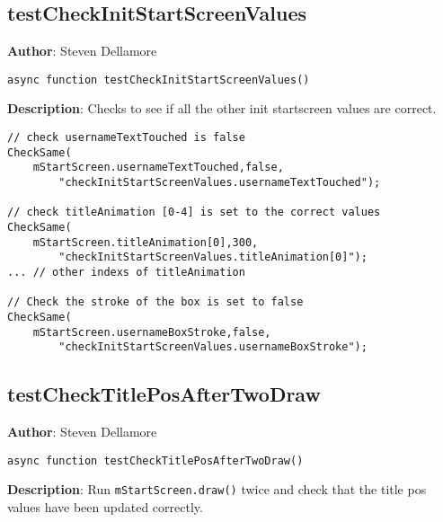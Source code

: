 \documentclass[12pt]{article}
\begin{document}
\subsection{testCheckInitStartScreenValues}
\textbf{Author}: Steven Dellamore 
\vspace*{1\baselineskip}
\begin{lstlisting}
async function testCheckInitStartScreenValues()
\end{lstlisting} 
\vspace*{1\baselineskip}
\textbf{Description}: Checks to see if all the other init startscreen values are correct. 
\begin{verbatim}
// check usernameTextTouched is false
CheckSame(
    mStartScreen.usernameTextTouched,false,
        "checkInitStartScreenValues.usernameTextTouched");

// check titleAnimation [0-4] is set to the correct values
CheckSame(
    mStartScreen.titleAnimation[0],300,
        "checkInitStartScreenValues.titleAnimation[0]");
... // other indexs of titleAnimation

// Check the stroke of the box is set to false
CheckSame(
    mStartScreen.usernameBoxStroke,false,
        "checkInitStartScreenValues.usernameBoxStroke");
\end{verbatim}
 



\subsection{testCheckTitlePosAfterTwoDraw}
\textbf{Author}: Steven Dellamore 
\vspace*{1\baselineskip}
\begin{lstlisting}
async function testCheckTitlePosAfterTwoDraw()
\end{lstlisting} 
\vspace*{1\baselineskip}
\textbf{Description}: Run \texttt{mStartScreen.draw()} twice and check that the title pos values have been updated correctly. 
\end{document}
